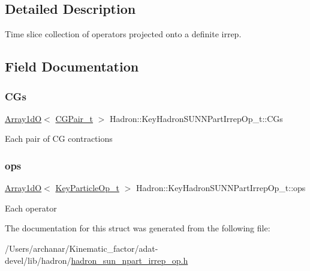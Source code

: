 \subsection{Detailed Description}
Time slice collection of operators projected onto a definite irrep. 

\subsection{Field Documentation}
\mbox{\label{structHadron_1_1KeyHadronSUNNPartIrrepOp__t_aa3ef7f36892b1bd638732a7ac69aa21d}} 
\subsubsection{\texorpdfstring{CGs}{CGs}}
{\footnotesize\ttfamily \mbox{\hyperlink{classADAT_1_1Array1dO}{Array1dO}}$<$ \mbox{\hyperlink{structHadron_1_1KeyHadronSUNNPartIrrepOp__t_1_1CGPair__t}{C\+G\+Pair\+\_\+t}} $>$ Hadron\+::\+Key\+Hadron\+S\+U\+N\+N\+Part\+Irrep\+Op\+\_\+t\+::\+C\+Gs}

Each pair of CG contractions \mbox{\label{structHadron_1_1KeyHadronSUNNPartIrrepOp__t_acc3063e2e1de5f3c10160e9f16e01308}} 
\subsubsection{\texorpdfstring{ops}{ops}}
{\footnotesize\ttfamily \mbox{\hyperlink{classADAT_1_1Array1dO}{Array1dO}}$<$ \mbox{\hyperlink{structHadron_1_1KeyParticleOp__t}{Key\+Particle\+Op\+\_\+t}} $>$ Hadron\+::\+Key\+Hadron\+S\+U\+N\+N\+Part\+Irrep\+Op\+\_\+t\+::ops}

Each operator 

The documentation for this struct was generated from the following file\+:\begin{DoxyCompactItemize}
\item 
/\+Users/archanar/\+Kinematic\+\_\+factor/adat-\/devel/lib/hadron/\mbox{\hyperlink{adat-devel_2lib_2hadron_2hadron__sun__npart__irrep__op_8h}{hadron\+\_\+sun\+\_\+npart\+\_\+irrep\+\_\+op.\+h}}\end{DoxyCompactItemize}
